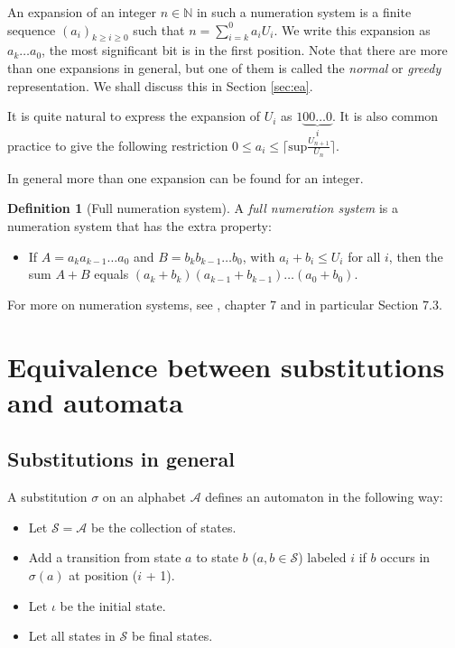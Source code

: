 \documentclass{article}
\theoremstyle{definition}
\newtheorem{definition}[theorem]{Definition}
\begin{document}
An expansion of an integer $n \in \mathbb{N}$ in such a numeration system is
a finite sequence $(a_i)_{k \ge i \ge 0}$ such that 
$n = \sum_{i = k}^0 a_i U_i$. We write this expansion as $a_k \ldots a_0$, the
most significant bit is in the first position. Note that there are more than
one expansions in general, but one of them is called the \emph{normal} or
\emph{greedy} representation. We shall discuss this in Section \ref{sec:ea}.

It is quite natural to express the expansion of $U_i$ as
$1\underbrace{00\ldots0}_i$. It is also common practice to give the following
restriction $0 \le a_i \le \lceil\mathrm{sup}\frac{U_{n + 1}}{U_n}\rceil$.

In general more than one expansion can be found for an integer.

\begin{definition}[Full numeration system] \label{def:full_numeration_system}
A \emph{full numeration system} is a numeration system that has the extra
property: 
\begin{itemize}
\item If $A = a_k a_{k - 1} \ldots a_0$ and $B = b_k b_{k - 1} \ldots b_0$, 
with $a_i + b_i \le U_i$ for all $i$, then the sum $A + B$ equals 
$(a_k + b_k) (a_{k - 1} + b_{k - 1}) \ldots (a_0 + b_0)$.
\end{itemize}
\end{definition}

For more on numeration systems, see \cite{Loth}, chapter 7 and in particular
Section 7.3.

\section{Equivalence between substitutions and automata}
\subsection{Substitutions in general}
A substitution $\sigma$ on an alphabet $\mathcal{A}$ defines an automaton in 
the following way:
\begin{itemize}
\item Let $\mathcal{S} = \mathcal{A}$ be the collection of states.
\item Add a transition from state $a$ to state $b$ ($a,b \in \mathcal{S}$) 
labeled $i$ if $b$ occurs in $\sigma(a)$ at position ($i$ + 1).
\item Let $\iota$ be the initial state.
\item Let all states in $\mathcal{S}$ be final states.
\end{itemize}
\end{document}
